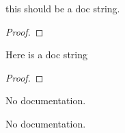 
\begin{lemma}\label{List.aux}
        \leanok
                this should be a doc string.
    \end{lemma}

\begin{proof}
    \leanok
\end{proof}

\begin{theorem}\label{List.Nat.Ex}
        \leanok
                Here is a doc string
    \end{theorem}

\begin{proof}
    \leanok
\end{proof}

\begin{lemma}\label{List.test}
                No documentation.
    \end{lemma}

\begin{theorem}\label{List.Test}
                No documentation.
    \end{theorem}

